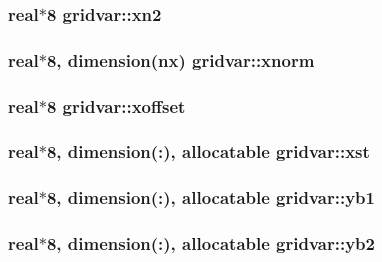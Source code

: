 \subsubsection[{xn2}]{\setlength{\rightskip}{0pt plus 5cm}real$\ast$8 gridvar\+::xn2}\label{namespacegridvar_a62f11262a634086d3483618aff305ad6}
\hypertarget{namespacegridvar_a0982bf7134515b2e97db0842a978bdcb}{}
\subsubsection[{xnorm}]{\setlength{\rightskip}{0pt plus 5cm}real$\ast$8, dimension({\bf nx}) gridvar\+::xnorm}\label{namespacegridvar_a0982bf7134515b2e97db0842a978bdcb}
\hypertarget{namespacegridvar_a31d3c65a0c90f341f558413f1f4386a6}{}
\subsubsection[{xoffset}]{\setlength{\rightskip}{0pt plus 5cm}real$\ast$8 gridvar\+::xoffset}\label{namespacegridvar_a31d3c65a0c90f341f558413f1f4386a6}
\hypertarget{namespacegridvar_a2f9709ea33206d334446b47b7e2ca726}{}
\subsubsection[{xst}]{\setlength{\rightskip}{0pt plus 5cm}real$\ast$8, dimension(\+:), allocatable gridvar\+::xst}\label{namespacegridvar_a2f9709ea33206d334446b47b7e2ca726}
\hypertarget{namespacegridvar_a330cf63f1dec7b8eb31c4d643cfa9c07}{}
\subsubsection[{yb1}]{\setlength{\rightskip}{0pt plus 5cm}real$\ast$8, dimension(\+:), allocatable gridvar\+::yb1}\label{namespacegridvar_a330cf63f1dec7b8eb31c4d643cfa9c07}
\hypertarget{namespacegridvar_af5cc21dee8d110e0ae7ce0e1370920cc}{}
\subsubsection[{yb2}]{\setlength{\rightskip}{0pt plus 5cm}real$\ast$8, dimension(\+:), allocatable gridvar\+::yb2}\label{namespacegridvar_af5cc21dee8d110e0ae7ce0e1370920cc}
\hypertarget{namespacegridvar_ae4e494722edb427de657fb301c02d39b}{}

